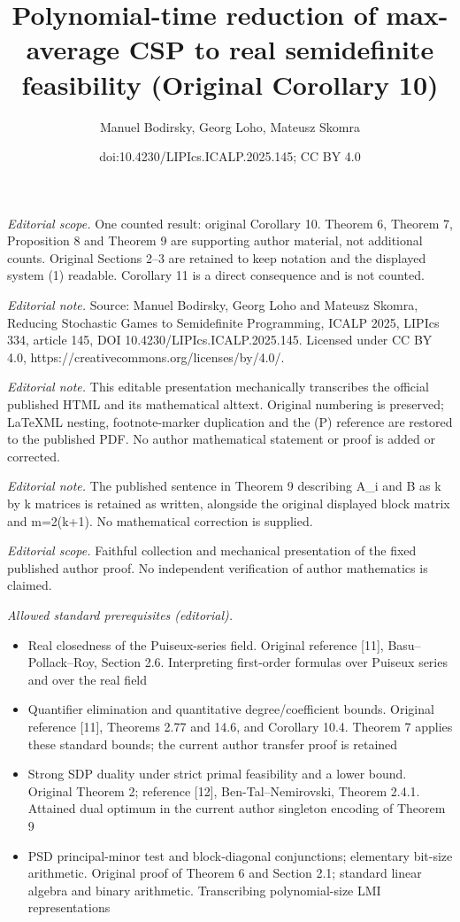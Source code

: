 \documentclass[10pt,a4paper]{article}
\title{Polynomial-time reduction of max-average CSP to real semidefinite feasibility (Original Corollary 10)}
\author{Manuel Bodirsky, Georg Loho, Mateusz Skomra}
\date{doi:10.4230/LIPIcs.ICALP.2025.145; CC BY 4.0}
\theoremstyle{definition}
\begin{document}
\maketitle
\noindent\textit{Editorial scope.} One counted result: original Corollary 10. Theorem 6, Theorem 7, Proposition 8 and Theorem 9 are supporting author material, not additional counts. Original Sections 2–3 are retained to keep notation and the displayed system (1) readable. Corollary 11 is a direct consequence and is not counted.\par\medskip
\noindent\textit{Editorial note.} Source: Manuel Bodirsky, Georg Loho and Mateusz Skomra, Reducing Stochastic Games to Semidefinite Programming, ICALP 2025, LIPIcs 334, article 145, DOI 10.4230/LIPIcs.ICALP.2025.145. Licensed under CC BY 4.0, https://creativecommons.org/licenses/by/4.0/.\par\medskip
\noindent\textit{Editorial note.} This editable presentation mechanically transcribes the official published HTML and its mathematical alttext. Original numbering is preserved; LaTeXML nesting, footnote-marker duplication and the (P) reference are restored to the published PDF. No author mathematical statement or proof is added or corrected.\par\medskip
\noindent\textit{Editorial note.} The published sentence in Theorem 9 describing A\_i and B as k by k matrices is retained as written, alongside the original displayed block matrix and m=2(k+1). No mathematical correction is supplied.\par\medskip
\noindent\textit{Editorial scope.} Faithful collection and mechanical presentation of the fixed published author proof. No independent verification of author mathematics is claimed.\par\medskip
\noindent\textit{Allowed standard prerequisites (editorial).}\begin{itemize}
\item Real closedness of the Puiseux-series field. Original reference [11], Basu–Pollack–Roy, Section 2.6. Interpreting first-order formulas over Puiseux series and over the real field
\item Quantifier elimination and quantitative degree/coefficient bounds. Original reference [11], Theorems 2.77 and 14.6, and Corollary 10.4. Theorem 7 applies these standard bounds; the current author transfer proof is retained
\item Strong SDP duality under strict primal feasibility and a lower bound. Original Theorem 2; reference [12], Ben-Tal–Nemirovski, Theorem 2.4.1. Attained dual optimum in the current author singleton encoding of Theorem 9
\item PSD principal-minor test and block-diagonal conjunctions; elementary bit-size arithmetic. Original proof of Theorem 6 and Section 2.1; standard linear algebra and binary arithmetic. Transcribing polynomial-size LMI representations
\end{itemize}\medskip
\end{document}
